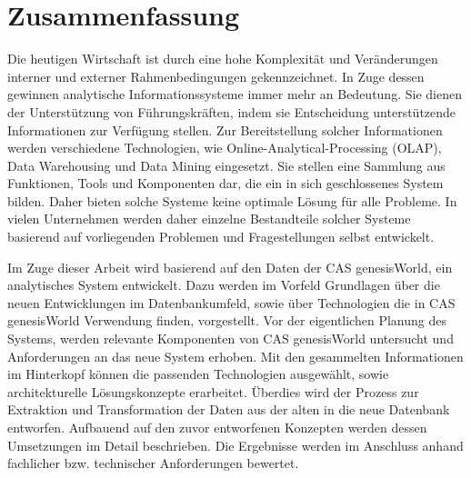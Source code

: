 
\chapter*{\centering Zusammenfassung}

Die heutigen Wirtschaft ist durch eine hohe Komplexität und Veränderungen interner und externer Rahmenbedingungen gekennzeichnet. In Zuge dessen gewinnen analytische Informationssysteme immer mehr an Bedeutung. Sie dienen der Unterstützung von Führungskräften, indem sie Entscheidung unterstützende Informationen zur Verfügung stellen. Zur Bereitstellung solcher Informationen werden verschiedene Technologien, wie Online-Analytical-Processing (OLAP), Data Warehousing und Data Mining eingesetzt. Sie stellen eine Sammlung aus Funktionen, Tools und Komponenten dar, die ein in sich geschlossenes System bilden. Daher bieten solche Systeme keine optimale Lösung für alle Probleme. In vielen Unternehmen werden daher einzelne Bestandteile solcher Systeme basierend auf vorliegenden Problemen und Fragestellungen selbst entwickelt. 

Im Zuge dieser Arbeit wird basierend auf den Daten der CAS genesisWorld, ein analytisches System entwickelt. Dazu werden im Vorfeld Grundlagen über die neuen Entwicklungen im Datenbankumfeld, sowie über Technologien die in CAS genesisWorld Verwendung finden, vorgestellt. Vor der eigentlichen Planung des Systems, werden relevante Komponenten von CAS genesisWorld untersucht und Anforderungen an das neue System erhoben. Mit den gesammelten Informationen im Hinterkopf können die passenden Technologien ausgewählt, sowie architekturelle Lösungskonzepte erarbeitet. Überdies wird der Prozess zur Extraktion und Transformation der Daten aus der alten in die neue Datenbank entworfen. Aufbauend auf den zuvor entworfenen Konzepten werden dessen Umsetzungen im Detail beschrieben. Die Ergebnisse werden im Anschluss anhand fachlicher bzw. technischer Anforderungen bewertet.